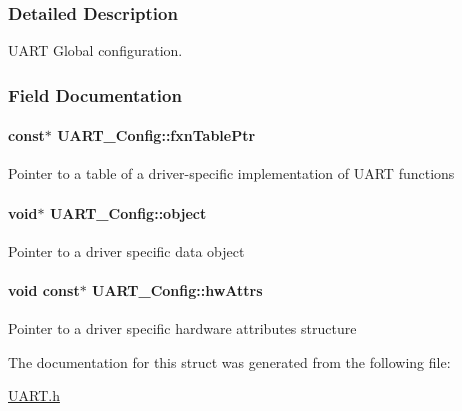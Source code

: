 \subsubsection{Detailed Description}
U\-A\-R\-T Global configuration. 

\subsubsection{Field Documentation}
\paragraph[{fxn\-Table\-Ptr}]{ const$\ast$ U\-A\-R\-T\-\_\-\-Config\-::fxn\-Table\-Ptr}\label{struct_u_a_r_t___config_a9e8073b7f55a5b3bc70d377e3b3f1375}
Pointer to a table of a driver-\/specific implementation of U\-A\-R\-T functions 
\paragraph[{object}]{\setlength{\rightskip}{0pt plus 5cm}void$\ast$ U\-A\-R\-T\-\_\-\-Config\-::object}\label{struct_u_a_r_t___config_a6472bcf07cd2c8ed0045fe01a934f583}
Pointer to a driver specific data object 
\paragraph[{hw\-Attrs}]{\setlength{\rightskip}{0pt plus 5cm}void const$\ast$ U\-A\-R\-T\-\_\-\-Config\-::hw\-Attrs}\label{struct_u_a_r_t___config_ad0baf0ebc820bca98fc7fbd089d1c55c}
Pointer to a driver specific hardware attributes structure 

The documentation for this struct was generated from the following file\-:\begin{DoxyCompactItemize}
\item 
\hyperlink{_u_a_r_t_8h}{U\-A\-R\-T.\-h}\end{DoxyCompactItemize}
